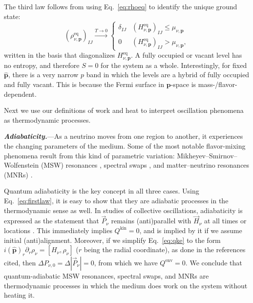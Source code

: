 \documentclass[aps,prl,twocolumn,groupedaddress]{revtex4-2}
\begin{document}
The third law follows from using Eq.~\eqref{eq:rhoeq} to identify the unique ground state:
\begin{equation}
\left( \rho^\textrm{eq}_{\nu,\boldsymbol{p}} \right)_{IJ} \xrightarrow{T \rightarrow 0}  \begin{cases}
\delta_{IJ} & \left( H_{\nu,\boldsymbol{p}}^\textrm{eq} \right)_{IJ} \leq \mu_{\nu,\boldsymbol{p}} \\ 
0 & \left( H_{\nu,\boldsymbol{p}}^\textrm{eq} \right)_{IJ} > \mu_{\nu,\boldsymbol{p}}, \label{eq:degenerate}
\end{cases}
\end{equation}
written in the basis that diagonalizes $H_{\nu,\boldsymbol{p}}^\textrm{eq}$. A fully occupied or vacant level has no entropy, and therefore $S = 0$ for the system as a whole. Interestingly, for fixed $\boldsymbol{\hat{p}}$, there is a very narrow $p$ band in which the levels are a hybrid of fully occupied and fully vacant. This is because the Fermi surface in $\boldsymbol{p}$-space is mass-/flavor-dependent.

Next we use our definitions of work and heat to interpret oscillation phenomena as thermodynamic processes.









\textbf{\textit{Adiabaticity.}}---As a neutrino moves from one region to another, it experiences the changing parameters of the medium. Some of the most notable flavor-mixing phenomena result from this kind of parametric variation: Mikheyev--Smirnov--Wolfenstein (MSW) resonances \cite{wolfenstein1978, mikheyev1985}, spectral swaps \cite{duan2006, duan2006b, raffelt2007, raffelt2007c, fogli2007, dasgupta2009, friedland2010, galais2011}, and matter--neutrino resonances (MNRs) \cite{malkus2012, malkus2014, malkus2016, wu2016, vaananen2016, zhu2016}.

Quantum adiabaticity is the key concept in all three cases. Using Eq.~\eqref{eq:firstlaw}, it is easy to show that they are adiabatic processes in the thermodynamic sense as well. In studies of collective oscillations, adiabaticity is expressed as the statement that $\vec{P}_\nu$ remains (anti)parallel with $\vec{H}_\nu$ at all times or locations \cite{qian1995a, duan2007c, raffelt2007c, wu2016}. This immediately implies $Q^\textrm{kin} = 0$, and is implied by it if we assume initial (anti)alignment. Moreover, if we simplify Eq.~\eqref{eq:qke} to the form $i (\boldsymbol{\hat{p}})_r \partial_r \rho_\nu = [H_\nu, \rho_\nu]$ ($r$ being the radial coordinate), as done in the references cited, then $\Delta P_{\nu,0} = \Delta | \vec{P}_\nu | = 0$, from which we have $Q^\textrm{env} = 0$. We conclude that quantum-adiabatic MSW resonances, spectral swaps, and MNRs are thermodynamic processes in which the medium does work on the system without heating it.
\end{document}
